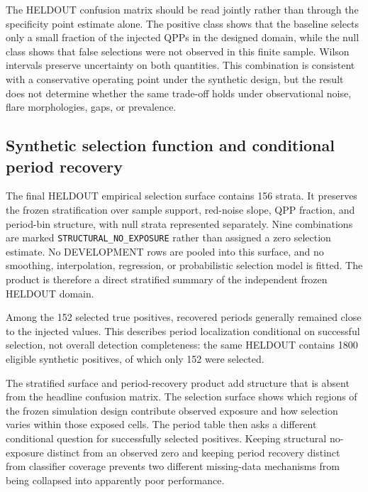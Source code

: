 \documentclass[11pt,a4paper]{article}
\begin{document}



The HELDOUT confusion matrix should be read jointly rather than through the specificity point estimate alone. The positive class shows that the baseline selects only a small fraction of the injected QPPs in the designed domain, while the null class shows that false selections were not observed in this finite sample. Wilson intervals preserve uncertainty on both quantities. This combination is consistent with a conservative operating point under the synthetic design, but the result does not determine whether the same trade-off holds under observational noise, flare morphologies, gaps, or prevalence.

\subsection{Synthetic selection function and conditional period recovery}
The final HELDOUT empirical selection surface contains 156 strata. It preserves the frozen stratification over sample support, red-noise slope, QPP fraction, and period-bin structure, with null strata represented separately. Nine combinations are marked \texttt{STRUCTURAL\_NO\_EXPOSURE} rather than assigned a zero selection estimate. No DEVELOPMENT rows are pooled into this surface, and no smoothing, interpolation, regression, or probabilistic selection model is fitted. The product is therefore a direct stratified summary of the independent frozen HELDOUT domain.

Among the 152 selected true positives, recovered periods generally remained close to the injected values. This describes period localization conditional on successful selection, not overall detection completeness: the same HELDOUT contains 1800 eligible synthetic positives, of which only 152 were selected.

The stratified surface and period-recovery product add structure that is absent from the headline confusion matrix. The selection surface shows which regions of the frozen simulation design contribute observed exposure and how selection varies within those exposed cells. The period table then asks a different conditional question for successfully selected positives. Keeping structural no-exposure distinct from an observed zero and keeping period recovery distinct from classifier coverage prevents two different missing-data mechanisms from being collapsed into apparently poor performance.
\end{document}
